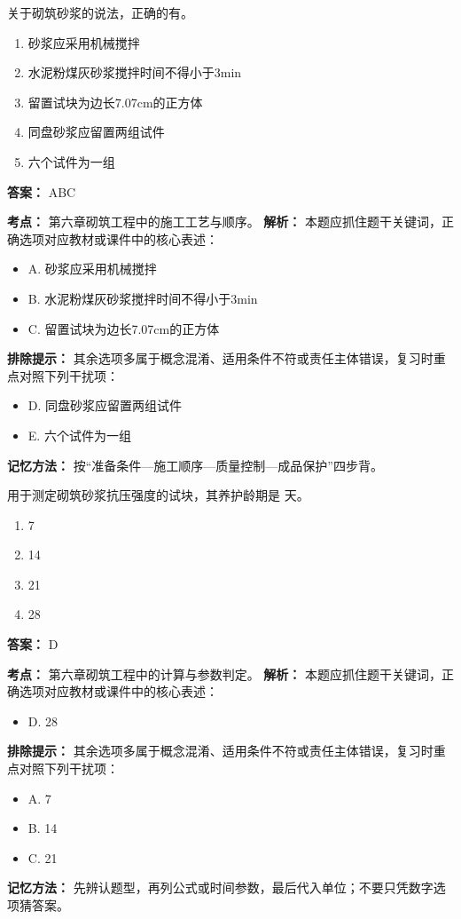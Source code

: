 \documentclass[UTF8,fontset=fandol,11pt]{ctexart}
\begin{document}
\begin{quizbox}[title={第 9 题}]
关于砌筑砂浆的说法，正确的有。\\
\begin{enumerate}[label=\Alph*.]
\item 砂浆应采用机械搅拌
\item 水泥粉煤灰砂浆搅拌时间不得小于3min
\item 留置试块为边长7.07cm的正方体
\item 同盘砂浆应留置两组试件
\item 六个试件为一组
\end{enumerate}
\textbf{答案：} ABC
\vspace{0.25em}
\begin{answerbox}[title={考点解析}]
\textbf{考点：} 第六章砌筑工程中的施工工艺与顺序。
\textbf{解析：} 本题应抓住题干关键词，正确选项对应教材或课件中的核心表述：
\begin{itemize}
\item A. 砂浆应采用机械搅拌
\item B. 水泥粉煤灰砂浆搅拌时间不得小于3min
\item C. 留置试块为边长7.07cm的正方体
\end{itemize}
\textbf{排除提示：} 其余选项多属于概念混淆、适用条件不符或责任主体错误，复习时重点对照下列干扰项：
\begin{itemize}
\item D. 同盘砂浆应留置两组试件
\item E. 六个试件为一组
\end{itemize}
\textbf{记忆方法：} 按“准备条件—施工顺序—质量控制—成品保护”四步背。
\end{answerbox}
\end{quizbox}

\begin{quizbox}[title={第 10 题}]
用于测定砌筑砂浆抗压强度的试块，其养护龄期是 天。\\
\begin{enumerate}[label=\Alph*.]
\item 7
\item 14
\item 21
\item 28
\end{enumerate}
\textbf{答案：} D
\vspace{0.25em}
\begin{answerbox}[title={考点解析}]
\textbf{考点：} 第六章砌筑工程中的计算与参数判定。
\textbf{解析：} 本题应抓住题干关键词，正确选项对应教材或课件中的核心表述：
\begin{itemize}
\item D. 28
\end{itemize}
\textbf{排除提示：} 其余选项多属于概念混淆、适用条件不符或责任主体错误，复习时重点对照下列干扰项：
\begin{itemize}
\item A. 7
\item B. 14
\item C. 21
\end{itemize}
\textbf{记忆方法：} 先辨认题型，再列公式或时间参数，最后代入单位；不要只凭数字选项猜答案。
\end{answerbox}
\end{quizbox}
\end{document}
